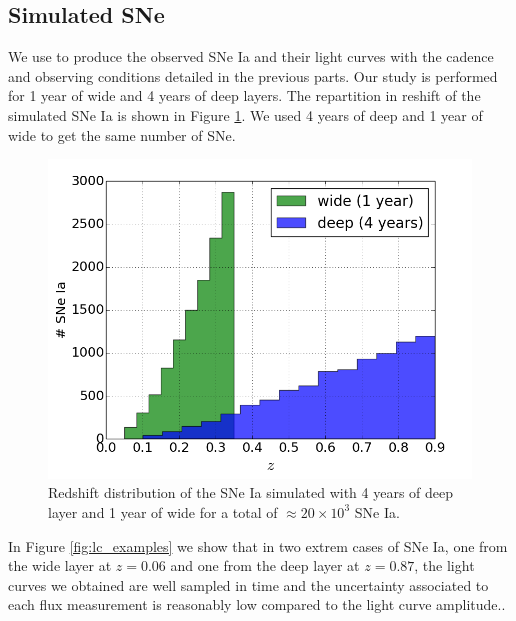 \documentclass[\docopts]{\docclass}
\begin{document}
\subsection{Simulated SNe}
\label{ssec::snsim}
We use  to produce the observed SNe Ia and their light curves with the cadence and observing conditions detailed in the previous parts.
Our study is performed for 1 year of wide and 4 years of deep layers.
The repartition in reshift of the simulated SNe Ia is shown in Figure \ref{fig:z_distrib}. We used 4 years of deep and 1 year of wide to get the same number of SNe.
\begin{figure}[ht]
  \centering
  \includegraphics[width=\linewidth]{z_surveys_population.png}
  \caption{Redshift distribution of the SNe Ia simulated with 4 years of deep layer and 1 year of wide for a total of $\approx 20\times10^3$ SNe Ia.}
  \label{fig:z_distrib}
\end{figure}
In Figure \ref{fig:lc_examples} we show that in two extrem cases of SNe Ia, one from the wide layer at $z=0.06$ and one from the deep layer at $z=0.87$, the light curves we obtained are well sampled in time and the uncertainty associated to each flux measurement is reasonably low compared to the light curve amplitude..
\end{document}
